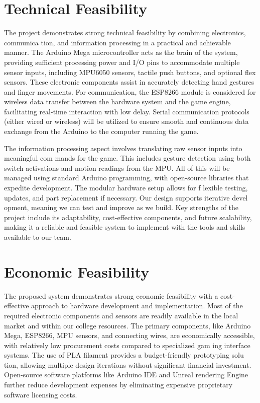 \section{Technical Feasibility}

 The project demonstrates strong technical feasibility by combining electronics, communica
tion, and information processing in a practical and achievable manner. The Arduino Mega
 microcontroller acts as the brain of the system, providing sufficient processing power and I/O
 pins to accommodate multiple sensor inputs, including MPU6050 sensors, tactile push buttons,
 and optional flex sensors. These electronic components assist in accurately detecting hand
 gestures and finger movements. For communication, the ESP8266 module is considered for
 wireless data transfer between the hardware system and the game engine, facilitating real-time
 interaction with low delay. Serial communication protocols (either wired or wireless) will be
 utilized to ensure smooth and continuous data exchange from the Arduino to the computer
 running the game.

  The information processing aspect involves translating raw sensor inputs into meaningful com
mands for the game. This includes gesture detection using both switch activations and motion
 readings from the MPU. All of this will be managed using standard Arduino programming,
 with open-source libraries that expedite development. The modular hardware setup allows for
 f
 lexible testing, updates, and part replacement if necessary. Our design supports iterative devel
opment, meaning we can test and improve as we build. Key strengths of the project include its
 adaptability, cost-effective components, and future scalability, making it a reliable and feasible
 system to implement with the tools and skills available to our team.

 \vspace{1.5\baselineskip}
\section{Economic Feasibility}

 The proposed system demonstrates strong economic feasibility with a cost-effective approach
 to hardware development and implementation. Most of the required electronic components
 and sensors are readily available in the local market and within our college resources. The
 primary components, like Arduino Mega, ESP8266, MPU sensors, and connecting wires, are
 economically accessible, with relatively low procurement costs compared to specialized gam
ing interface systems. The use of PLA filament provides a budget-friendly prototyping solu
tion, allowing multiple design iterations without significant financial investment. Open-source
 software platforms like Arduino IDE and Unreal rendering Engine further reduce development
 expenses by eliminating expensive proprietary software licensing costs.

